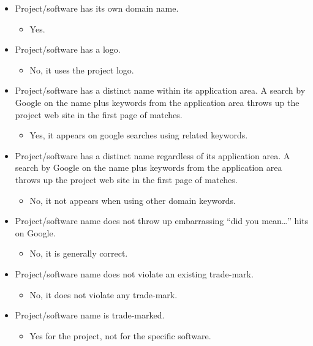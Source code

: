 \begin{itemize}
\itemsep1pt\parskip0pt
\item
  Project/software has its own domain name.

  \begin{itemize}
  \itemsep1pt\parskip0pt
  \item
    Yes.
  \end{itemize}
\item
  Project/software has a logo.

  \begin{itemize}
  \itemsep1pt\parskip0pt
  \item
    No, it uses the project logo.
  \end{itemize}
\item
  Project/software has a distinct name within its application area. A
  search by Google on the name plus keywords from the application area
  throws up the project web site in the first page of matches.

  \begin{itemize}
  \itemsep1pt\parskip0pt
  \item
    Yes, it appears on google searches using related keywords.
  \end{itemize}
\item
  Project/software has a distinct name regardless of its application
  area. A search by Google on the name plus keywords from the
  application area throws up the project web site in the first page of
  matches.

  \begin{itemize}
  \itemsep1pt\parskip0pt
  \item
    No, it not appears when using other domain keywords.
  \end{itemize}
\item
  Project/software name does not throw up embarrassing ``did you
  mean\ldots{}'' hits on Google.

  \begin{itemize}
  \itemsep1pt\parskip0pt
  \item
    No, it is generally correct.
  \end{itemize}
\item
  Project/software name does not violate an existing trade-mark.

  \begin{itemize}
  \itemsep1pt\parskip0pt
  \item
    No, it does not violate any trade-mark.
  \end{itemize}
\item
  Project/software name is trade-marked.

  \begin{itemize}
  \itemsep1pt\parskip0pt
  \item
    Yes for the project, not for the specific software.
  \end{itemize}
\end{itemize}

